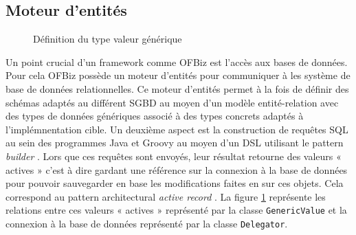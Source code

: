 \documentclass[a4paper, 11pt]{report}
\begin{document}
\subsection{Moteur d'entités}

\begin{figure}
  \centering
  \caption{Définition du type valeur générique}
  \label{fig:genericvalue}
\end{figure}

Un point crucial d'un framework comme OFBiz est l'accès aux bases de
données.  Pour cela OFBiz possède un moteur d'entités pour communiquer
à les système de base de données relationnelles.  Ce moteur d'entités
permet à la fois de définir des schémas adaptés au différent SGBD au
moyen d'un modèle entité-relation avec des types de données génériques
associé à des types concrets adaptés à l'implémnentation cible. Un
deuxième aspect est la construction de requêtes SQL au sein des
programmes Java et Groovy au moyen d'un DSL utilisant le pattern
\emph{builder} \cite{gamma1993design}. Lors que ces requêtes sont
envoyés, leur résultat retourne des valeurs « actives » c'est à dire
gardant une référence sur la connexion à la base de données pour
pouvoir sauvegarder en base les modifications faites en sur ces
objets.  Cela correspond au pattern architectural \emph{active record}
\cite{fowler2002patterns}.  La figure \ref{fig:genericvalue}
représente les relations entre ces valeurs « actives » représenté par
la classe \verb=GenericValue= et la connexion à la base de données
représenté par la classe \verb=Delegator=.
\end{document}

